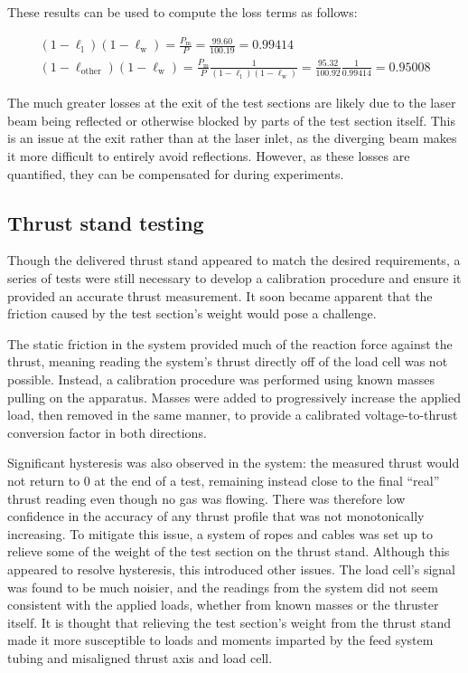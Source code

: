                 These results can be used to compute the loss terms as follows:

                \begin{gather*}
                    (1-\ell_\mathrm{l})(1-\ell_\mathrm{w}) = \frac{P_\mathrm{m}}{P} = \frac{99.60}{100.19} = 0.99414 \\
                    (1-\ell_\mathrm{other})(1-\ell_\mathrm{w}) = \frac{P_\mathrm{m}}{P}\frac{1}{(1-\ell_\mathrm{l})(1-\ell_\mathrm{w})} = \frac{95.32}{100.92}\frac{1}{0.99414} = 0.95008
                \end{gather*}
                
                The much greater losses at the exit of the test sections are likely due to the laser beam being reflected or otherwise blocked by parts of the test section itself. This is an issue at the exit rather than at the laser inlet, as the diverging beam makes it more difficult to entirely avoid reflections. However, as these losses are quantified, they can be compensated for during experiments.

        \subsection{Thrust stand testing}
                Though the delivered thrust stand appeared to match the desired requirements, a series of tests were still necessary to develop a calibration procedure and ensure it provided an accurate thrust measurement. It soon became apparent that the friction caused by the test section's weight would pose a challenge.
                
                The static friction in the system provided much of the reaction force against the thrust, meaning reading the system's thrust directly off of the load cell was not possible. Instead, a calibration procedure was performed using known masses pulling on the apparatus. Masses were added to progressively increase the applied load, then removed in the same manner, to provide a calibrated voltage-to-thrust conversion factor in both directions.
                
                Significant hysteresis was also observed in the system: the measured thrust would not return to 0 at the end of a test, remaining instead close to the final ``real'' thrust reading even though no gas was flowing. There was therefore low confidence in the accuracy of any thrust profile that was not monotonically increasing. To mitigate this issue, a system of ropes and cables was set up to relieve some of the weight of the test section on the thrust stand. Although this appeared to resolve hysteresis, this introduced other issues. The load cell's signal was found to be much noisier, and the readings from the system did not seem consistent with the applied loads, whether from known masses or the thruster itself. It is thought that relieving the test section's weight from the thrust stand made it more susceptible to loads and moments imparted by the feed system tubing and misaligned thrust axis and load cell.

